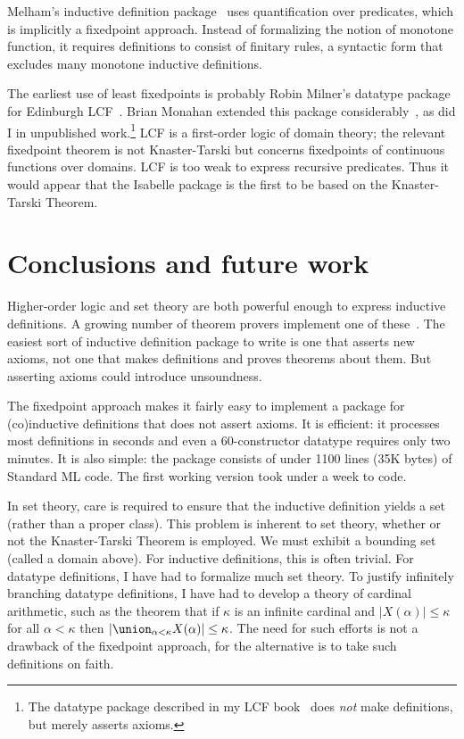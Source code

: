 Melham's inductive definition package~\cite{camilleri92} uses
quantification over predicates, which is implicitly a fixedpoint approach.
Instead of formalizing the notion of monotone function, it requires
definitions to consist of finitary rules, a syntactic form that excludes
many monotone inductive definitions.

The earliest use of least fixedpoints is probably Robin Milner's datatype
package for Edinburgh LCF~\cite{milner-ind}.  Brian Monahan extended this
package considerably~\cite{monahan84}, as did I in unpublished
work.\footnote{The datatype package described in my LCF
  book~\cite{paulson87} does {\it not\/} make definitions, but merely
  asserts axioms.}
LCF is a first-order logic of domain theory; the relevant fixedpoint
theorem is not Knaster-Tarski but concerns fixedpoints of continuous
functions over domains.  LCF is too weak to express recursive predicates.
Thus it would appear that the Isabelle package is the first to be based
on the Knaster-Tarski Theorem.


\section{Conclusions and future work}
Higher-order logic and set theory are both powerful enough to express
inductive definitions.  A growing number of theorem provers implement one
of these~\cite{IMPS,saaltink-fme}.  The easiest sort of inductive
definition package to write is one that asserts new axioms, not one that
makes definitions and proves theorems about them.  But asserting axioms
could introduce unsoundness.

The fixedpoint approach makes it fairly easy to implement a package for
(co)inductive definitions that does not assert axioms.  It is efficient: it
processes most definitions in seconds and even a 60-constructor datatype
requires only two minutes.  It is also simple: the package consists of
under 1100 lines (35K bytes) of Standard ML code.  The first working
version took under a week to code.

In set theory, care is required to ensure that the inductive definition
yields a set (rather than a proper class).  This problem is inherent to set
theory, whether or not the Knaster-Tarski Theorem is employed.  We must
exhibit a bounding set (called a domain above).  For inductive definitions,
this is often trivial.  For datatype definitions, I have had to formalize
much set theory.  To justify infinitely branching datatype definitions, I
have had to develop a theory of cardinal arithmetic, such as the theorem
that if $\kappa$ is an infinite cardinal and $|X(\alpha)| \le \kappa$ for
all $\alpha<\kappa$ then $|\union\sb{\alpha<\kappa} X(\alpha)| \le \kappa$.
The need for such efforts is not a drawback of the fixedpoint
approach, for the alternative is to take such definitions on faith.

